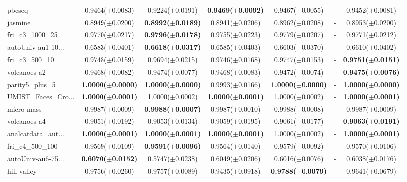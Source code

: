 \begin{longtable}{lcccccc}
pbcseq & 0.9464($\pm$0.0083) & 0.9224($\pm$0.0191) & \textbf{0.9469($\pm$0.0092)} & 0.9467($\pm$0.0055) & - & 0.9452($\pm$0.0081) \\
jasmine & 0.8949($\pm$0.0200) & \textbf{0.8992($\pm$0.0189)} & 0.8941($\pm$0.0206) & 0.8962($\pm$0.0208) & - & 0.8953($\pm$0.0200) \\
fri\_c3\_1000\_25 & 0.9770($\pm$0.0217) & \textbf{0.9796($\pm$0.0178)} & 0.9755($\pm$0.0223) & 0.9779($\pm$0.0207) & - & 0.9771($\pm$0.0212) \\
autoUniv-au1-10... & 0.6583($\pm$0.0401) & \textbf{0.6618($\pm$0.0317)} & 0.6585($\pm$0.0403) & 0.6603($\pm$0.0370) & - & 0.6610($\pm$0.0402) \\
fri\_c3\_500\_10 & 0.9748($\pm$0.0159) & 0.9694($\pm$0.0215) & 0.9746($\pm$0.0168) & 0.9747($\pm$0.0153) & - & \textbf{0.9751($\pm$0.0151)} \\
volcanoes-a2 & 0.9468($\pm$0.0082) & 0.9474($\pm$0.0077) & 0.9468($\pm$0.0083) & 0.9472($\pm$0.0074) & - & \textbf{0.9475($\pm$0.0076)} \\
parity5\_plus\_5 & \textbf{1.0000($\pm$0.0000)} & \textbf{1.0000($\pm$0.0000)} & 0.9993($\pm$0.0166) & \textbf{1.0000($\pm$0.0000)} & - & \textbf{1.0000($\pm$0.0000)} \\
UMIST\_Faces\_Cro... & \textbf{1.0000($\pm$0.0001)} & 1.0000($\pm$0.0002) & \textbf{1.0000($\pm$0.0001)} & 1.0000($\pm$0.0002) & - & \textbf{1.0000($\pm$0.0001)} \\
micro-mass & 0.9987($\pm$0.0009) & \textbf{0.9988($\pm$0.0007)} & 0.9987($\pm$0.0010) & 0.9988($\pm$0.0008) & - & 0.9987($\pm$0.0009) \\
volcanoes-a4 & 0.9051($\pm$0.0192) & 0.9053($\pm$0.0134) & 0.9059($\pm$0.0195) & 0.9061($\pm$0.0177) & - & \textbf{0.9063($\pm$0.0191)} \\
analcatdata\_aut... & \textbf{1.0000($\pm$0.0001)} & \textbf{1.0000($\pm$0.0001)} & \textbf{1.0000($\pm$0.0001)} & 1.0000($\pm$0.0002) & - & \textbf{1.0000($\pm$0.0001)} \\
fri\_c4\_500\_100 & 0.9569($\pm$0.0109) & \textbf{0.9591($\pm$0.0096)} & 0.9564($\pm$0.0140) & 0.9579($\pm$0.0092) & - & 0.9570($\pm$0.0106) \\
autoUniv-au6-75... & \textbf{0.6070($\pm$0.0152)} & 0.5747($\pm$0.0238) & 0.6049($\pm$0.0206) & 0.6016($\pm$0.0076) & - & 0.6038($\pm$0.0176) \\
hill-valley & 0.9756($\pm$0.0260) & 0.9757($\pm$0.0089) & 0.9435($\pm$0.0918) & \textbf{0.9788($\pm$0.0079)} & - & 0.9641($\pm$0.0679) \\

\end{longtable}

